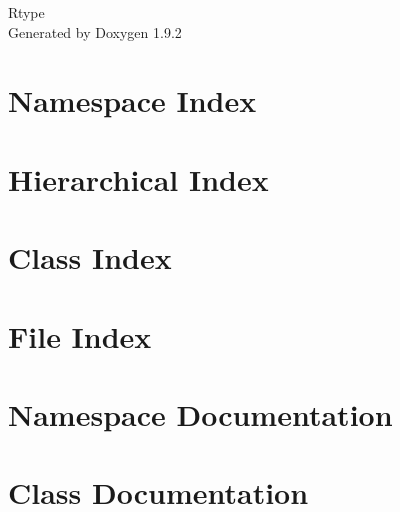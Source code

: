 \documentclass[twoside]{book}
\newcommand{\+}{\discretionary{\mbox{\scriptsize$\hookleftarrow$}}{}{}}
\newcommand{\clearemptydoublepage}{%
    \newpage{\pagestyle{empty}\cleardoublepage}%
  }
\begin{document}
  \raggedbottom
    \hypersetup{pageanchor=false,
                bookmarksnumbered=true,
                pdfencoding=unicode
               }
  \begin{titlepage}
  \vspace*{7cm}
  \begin{center}%
  {\Large Rtype}\\
  \vspace*{1cm}
  {\large Generated by Doxygen 1.9.2}\\
  \end{center}
  \end{titlepage}
  \clearemptydoublepage
  \tableofcontents
  \clearemptydoublepage
  \hypersetup{pageanchor=true}
\chapter{Namespace Index}

\chapter{Hierarchical Index}

\chapter{Class Index}

\chapter{File Index}

\chapter{Namespace Documentation}

\chapter{Class Documentation}












































\end{document}

